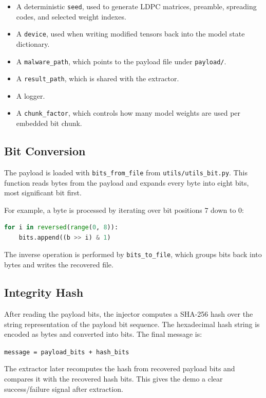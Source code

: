 \documentclass[11pt,a4paper]{article}
\newcommand{\code}[1]{\texttt{#1}}
\begin{document}
\begin{itemize}[leftmargin=1.4em]
  \item A deterministic \code{seed}, used to generate LDPC matrices, preamble, spreading codes, and selected weight indexes.
  \item A \code{device}, used when writing modified tensors back into the model state dictionary.
  \item A \code{malware\_path}, which points to the payload file under \code{payload/}.
  \item A \code{result\_path}, which is shared with the extractor.
  \item A logger.
  \item A \code{chunk\_factor}, which controls how many model weights are used per embedded bit chunk.
\end{itemize}

\subsection{Bit Conversion}

The payload is loaded with \code{bits\_from\_file} from \code{utils/utils\_bit.py}. This function reads bytes from the payload and expands every byte into eight bits, most significant bit first.

For example, a byte is processed by iterating over bit positions 7 down to 0:

\begin{lstlisting}[language=Python]
for i in reversed(range(0, 8)):
    bits.append((b >> i) & 1)
\end{lstlisting}

The inverse operation is performed by \code{bits\_to\_file}, which groups bits back into bytes and writes the recovered file.

\subsection{Integrity Hash}

After reading the payload bits, the injector computes a SHA-256 hash over the string representation of the payload bit sequence. The hexadecimal hash string is encoded as bytes and converted into bits. The final message is:

\begin{center}
\code{message = payload\_bits + hash\_bits}
\end{center}

The extractor later recomputes the hash from recovered payload bits and compares it with the recovered hash bits. This gives the demo a clear success/failure signal after extraction.
\end{document}
